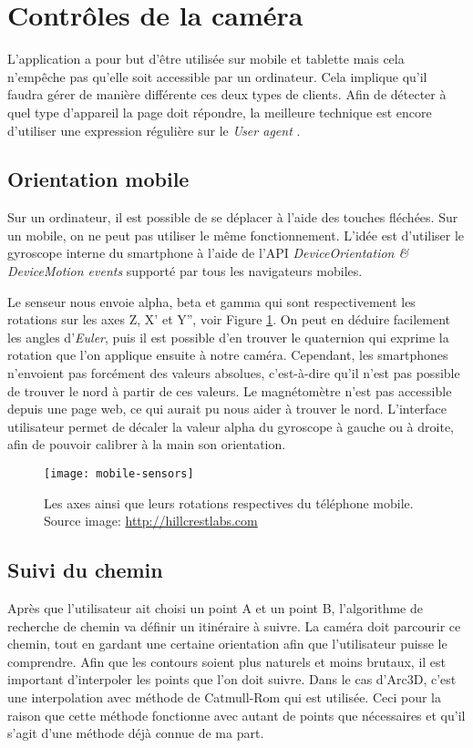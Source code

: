 \section{Contrôles de la caméra}
L'application a pour but d'être utilisée sur mobile et tablette mais cela n'empêche pas qu'elle soit accessible par un ordinateur. Cela implique qu'il faudra gérer de manière différente ces deux types de clients. Afin de détecter à quel type d'appareil la page doit répondre, la meilleure technique est encore d'utiliser une expression régulière sur le \emph{User agent} \cite{wiki-useragent}.

\subsection{Orientation mobile}
Sur un ordinateur, il est possible de se déplacer à l'aide des touches fléchées. Sur un mobile, on ne peut pas utiliser le même fonctionnement. L'idée est d'utiliser le gyroscope interne du smartphone à l'aide de l'API \emph{DeviceOrientation \& DeviceMotion events}\cite{w3c-orientation} supporté par tous les navigateurs mobiles\cite{caniuse-DeviceMotion}. 

Le senseur nous envoie alpha, beta et gamma qui sont respectivement les rotations sur les axes Z, X' et Y'', voir Figure \ref{fig:mobile-angles}. On peut en déduire facilement les angles d'\emph{Euler}, puis il est possible d'en trouver le quaternion qui exprime la rotation que l'on applique ensuite à notre caméra. Cependant, les smartphones n'envoient pas forcément des valeurs absolues, c'est-à-dire qu'il n'est pas possible de trouver le nord à partir de ces valeurs. Le magnétomètre n'est pas accessible depuis une page web, ce qui aurait pu nous aider à trouver le nord. L'interface utilisateur permet de décaler la valeur alpha du gyroscope à gauche ou à droite, afin de pouvoir calibrer à la main son orientation.

\begin{figure}
	\centering
	\texttt{[image: mobile-sensors]}
	\caption{Les axes ainsi que leurs rotations respectives du téléphone mobile. Source image: \url{http://hillcrestlabs.com}}
	\label{fig:mobile-angles}
\end{figure}

\subsection{Suivi du chemin}
Après que l'utilisateur ait choisi un point A et un point B, l'algorithme de recherche de chemin va définir un itinéraire à suivre. La caméra doit parcourir ce chemin, tout en gardant une certaine orientation afin que l'utilisateur puisse le comprendre. Afin que les contours soient plus naturels et moins brutaux, il est important d'interpoler les points que l'on doit suivre. Dans le cas d'Arc3D, c'est une interpolation avec méthode de Catmull-Rom qui est utilisée. Ceci pour la raison que cette méthode fonctionne avec autant de points que nécessaires et qu'il s'agit d'une méthode déjà connue de ma part.

